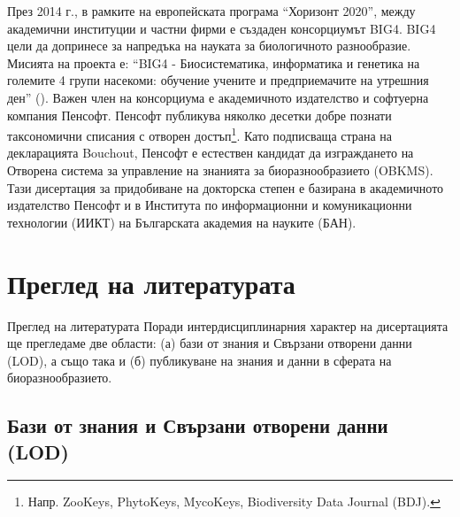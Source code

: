 През 2014 г., в рамките на европейската програма ``Хоризонт 2020'', между академични институции и частни фирми е създаден консорциумът BIG4. BIG4 цели да допринесе за напредъка на науката за биологичното разнообразие. Мисията на проекта е: ``BIG4 - Биосистематика, информатика и генетика на големите 4 групи насекоми: обучение учените и предприемачите на утрешния ден'' (\cite{university_of_copenhagen_big4_2014}). Важен член на консорциума е академичното издателство и софтуерна компания Пенсофт. Пенсофт публикува няколко десетки добре познати таксономични списания с отворен достъп\footnote{Напр. ZooKeys, PhytoKeys, MycoKeys, Biodiversity Data Journal (BDJ).}. Като подписваща страна на декларацията Bouchout, Пенсофт е естествен кандидат да изграждането на  Отворена система за управление на знанията за биоразнообразието (OBKMS). Тази дисертация за придобиване на докторска степен е базирана в академичното издателство Пенсофт и в Института по информационни и комуникационни технологии (ИИКТ) на Българската академия на науките (БАН).

\section* {Преглед на литературата}
 {Преглед на литературата}
Поради интердисциплинарния характер на дисертацията ще прегледаме две области: (а) бази от знания и Свързани отворени данни (LOD), а също така и (б) публикуване на знания и данни в сферата на биоразнообразието.

\subsection*{Бази от знания и Свързани отворени данни (LOD)}

